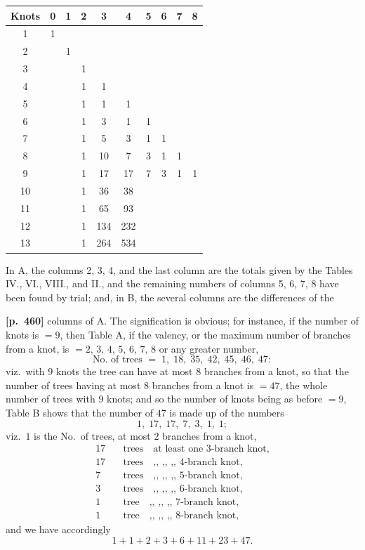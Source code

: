 \documentclass[11pt,a4paper]{article}
\begin{document}
\begin{center}
\renewcommand{\arraystretch}{1.1}
\begin{tabular}{c|ccccccccc}
\hline
Knots & 0 & 1 & 2 & 3 & 4 & 5 & 6 & 7 & 8 \\
\hline
1  & 1 &   &   &   &   &   &   &   &   \\
2  &   & 1 &   &   &   &   &   &   &   \\
3  &   &   & 1 &   &   &   &   &   &   \\
4  &   &   & 1 & 1 &   &   &   &   &   \\
5  &   &   & 1 & 1 & 1 &   &   &   &   \\
6  &   &   & 1 & 3 & 1 & 1 &   &   &   \\
7  &   &   & 1 & 5 & 3 & 1 & 1 &   &   \\
8  &   &   & 1 & 10 & 7 & 3 & 1 & 1 &   \\
9  &   &   & 1 & 17 & 17 & 7 & 3 & 1 & 1 \\
10 &   &   & 1 & 36 & 38 &   &   &   &   \\
11 &   &   & 1 & 65 & 93 &   &   &   &   \\
12 &   &   & 1 & 134 & 232 &   &   &   &   \\
13 &   &   & 1 & 264 & 534 &   &   &   &   \\
\hline
\end{tabular}
\end{center}

\medskip
In A, the columns 2, 3, 4, and the last column are the totals given by the Tables IV., VI., VIII., and II., and the remaining numbers of columns 5, 6, 7, 8 have been found by trial; and, in B, the several columns are the differences of the

\bigskip
\noindent\textbf{[p.~460]}\quad
columns of A. The signification is obvious; for instance, if the number of knots is $=9$, then Table A, if the valency, or the maximum number of branches from a knot, is $=2,\,3,\,4,\,5,\,6,\,7,\,8$ or any greater number,
\[
\text{No.\ of trees }=\;1,\;18,\;35,\;42,\;45,\;46,\;47:
\]
viz.\ with $9$ knots the tree can have at most $8$ branches from a knot, so that the number of trees having at most $8$ branches from a knot is $=47$, the whole number of trees with $9$ knots; and so the number of knots being as before $=9$, Table B shows that the number of $47$ is made up of the numbers
\[
1,\;17,\;17,\;7,\;3,\;1,\;1;
\]
viz.\ $1$ is the No.\ of trees, at most $2$ branches from a knot,
\begin{align*}
17 &\quad\text{trees}\quad\text{at least one $3$-branch knot,}\\
17 &\quad\text{trees}\quad\text{,, ,, ,, $4$-branch knot,}\\
7  &\quad\text{trees}\quad\text{,, ,, ,, $5$-branch knot,}\\
3  &\quad\text{trees}\quad\text{,, ,, ,, $6$-branch knot,}\\
1  &\quad\text{tree}\quad\text{,, ,, ,, $7$-branch knot,}\\
1  &\quad\text{tree}\quad\text{,, ,, ,, $8$-branch knot,}
\end{align*}
and we have accordingly
\[
1+1+2+3+6+11+23+47.
\]
\end{document}
